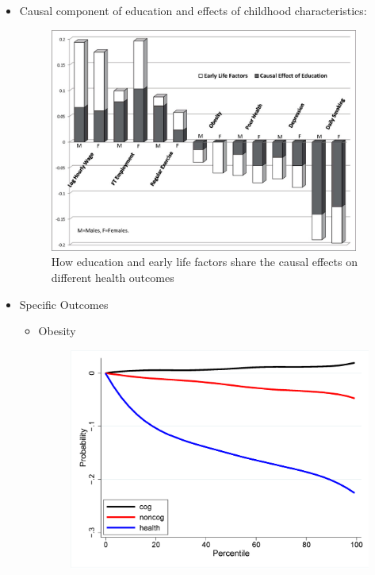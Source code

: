             \begin{itemize}
                \item Causal component of education and effects of childhood characteristics: 
                    \begin{figure}[H]%
                        \centering
                        \includegraphics[width=4in]{images/ch3/44.png}
                        \caption{How education and early life factors share the causal effects on different health outcomes}
                    \end{figure}
                \item Specific Outcomes
                \begin{itemize}
                    \item Obesity
                        \begin{figure}[H]%
                            \centering
                            \includegraphics[width=4in]{images/ch3/46.png}

\end{figure}
\end{itemize}
\end{itemize}
